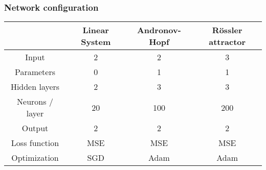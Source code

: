 \begin{frame}
	\frametitle{Network configuration}
	\centering
	\begin{tabular} { c | c | c | c}
						& Linear System & Andronov-Hopf & R\"ossler attractor	\\
		\hline
		Input			& 2 		& 2			& 3			\\
		\hline
		Parameters		& 0 		& 1			& 1			\\
		\hline
		Hidden layers	& 2			& 3			& 3			\\
		\hline
		Neurons / layer	& 20		& 100		& 200		\\
		\hline
		Output			& 2			& 2			& 2			\\
		\hline
		Loss function	& MSE		& MSE		& MSE		\\
		\hline
		Optimization	& SGD		& Adam		& Adam		\\
	\end{tabular}
\end{frame}
